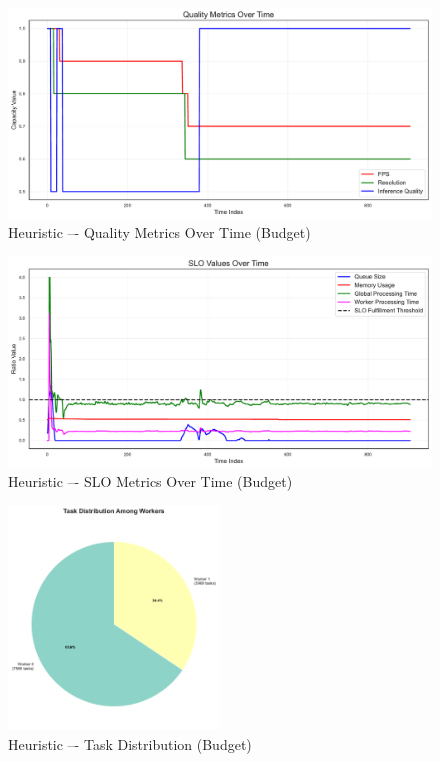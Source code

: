 \begin{figure}[h]
    \centering
    \includegraphics[width=\textwidth]{img/results/variable_computational_budget/heuristic_quality_metrics.pdf}
    \caption{Heuristic –- Quality Metrics Over Time (Budget)}
\end{figure}
\begin{figure}[h]
    \centering
    \includegraphics[width=\textwidth]{img/results/variable_computational_budget/heuristic_slo_values.pdf}
    \caption{Heuristic –- SLO Metrics Over Time (Budget)}
\end{figure}
\begin{figure}[h]
    \centering
    \includegraphics[width=0.5\textwidth]{img/results/variable_computational_budget/heuristic_task_distribution_pie.pdf}
    \caption{Heuristic –- Task Distribution (Budget)}
\end{figure}

